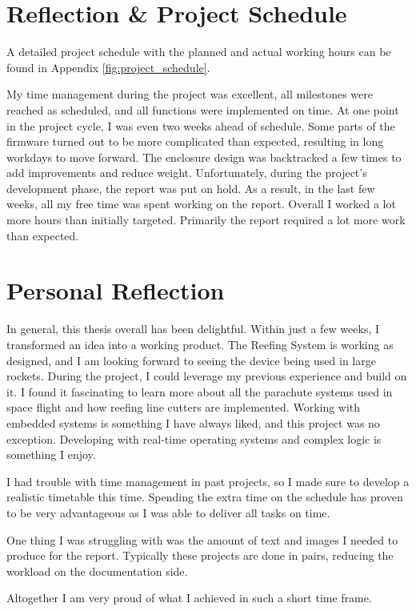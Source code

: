 \section{Reflection \& Project Schedule}
A detailed project schedule with the planned and actual working hours can be found in Appendix \ref{fig:project_schedule}.

My time management during the project was excellent, all milestones were reached as scheduled, and all functions were implemented on time. At one point in the project cycle, I was even two weeks ahead of schedule. Some parts of the firmware turned out to be more complicated than expected, resulting in long workdays to move forward. The enclosure design was backtracked a few times to add improvements and reduce weight. Unfortunately, during the project's development phase, the report was put on hold. As a result, in the last few weeks, all my free time was spent working on the report. Overall I worked a lot more hours than initially targeted. Primarily the report required a lot more work than expected.   

\section{Personal Reflection}

In general, this thesis overall has been delightful. Within just a few weeks, I transformed an idea into a working product. The Reefing System is working as designed, and I am looking forward to seeing the device being used in large rockets. During the project, I could leverage my previous experience and build on it. I found it fascinating to learn more about all the parachute systems used in space flight and how reefing line cutters are implemented. Working with embedded systems is something I have always liked, and this project was no exception. Developing with real-time operating systems and complex logic is something I enjoy. 

I had trouble with time management in past projects, so I made sure to develop a realistic timetable this time. Spending the extra time on the schedule has proven to be very advantageous as I was able to deliver all tasks on time. 

One thing I was struggling with was the amount of text and images I needed to produce for the report. Typically these projects are done in pairs, reducing the workload on the documentation side.

Altogether I am very proud of what I achieved in such a short time frame. 
